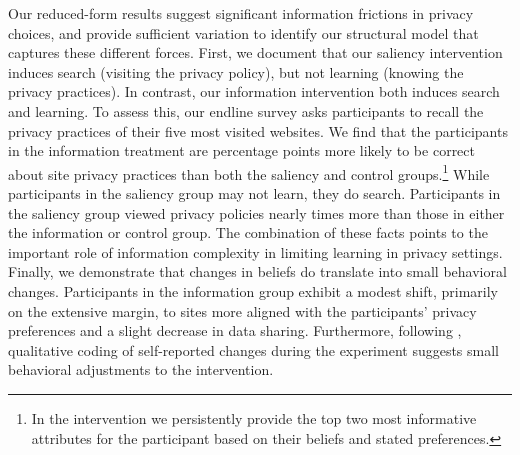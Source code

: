 \documentclass[12pt]{article}
\theoremstyle{definition}
\theoremstyle{remark}
\begin{document}
Our reduced-form results suggest significant information frictions in privacy choices, and provide sufficient variation to identify our structural model that captures these different forces. First, we document that our saliency intervention induces search (visiting the privacy policy), but not learning (knowing the privacy practices). In contrast, our information intervention both induces search and learning. To assess this, our endline survey asks participants to recall the privacy practices of their five most visited websites. We find that the participants in the information treatment are \beliefCorrectInfoVsRestPP{} percentage points more likely to be correct about site privacy practices than both the saliency and control groups.\footnote{In the intervention we persistently provide the top two most informative attributes for the participant based on their beliefs and stated preferences.} 
While participants in the saliency group may not learn, they do search. Participants in the saliency group viewed privacy policies nearly \policyVisitSaliencyFold{} times more than those in either the information or control group. The combination of these facts points to the important role of information complexity in limiting learning in privacy settings. Finally, we demonstrate that changes in beliefs do translate into small behavioral changes. Participants in the information group exhibit a modest shift, primarily on the extensive margin, to sites more aligned with the participants' privacy preferences and a slight decrease in data sharing. Furthermore, following \cite{haaland2025understanding}, qualitative coding of self-reported changes during the experiment suggests small behavioral adjustments to the intervention.
\end{document}
